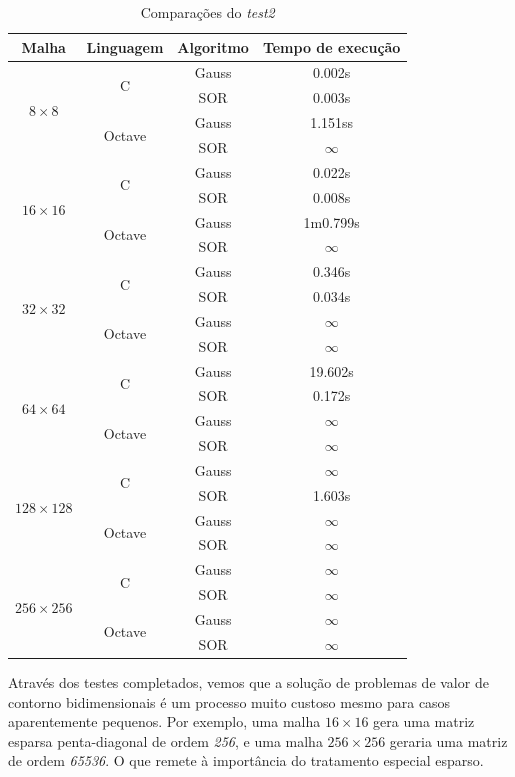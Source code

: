 \documentclass[
	11pt,				%
	oneside,			%
	a4paper,			%
	english,			%
	brazil,				%
	]{article}
\begin{document}
\begin{table}[ht]
\centering
\begin{tabular}{cccc}
\hline 
\textbf{Malha} & \textbf{Linguagem} & \textbf{Algoritmo} & \textbf{Tempo de execução} \\
\hline
\multirow{4}{*}{\textit{$8 \times 8$}} & \multirow{2}{*}{C}  & Gauss & 0.002s  \\ 
& & SOR & 0.003s  \\
& \multirow{2}{*}{Octave} & Gauss & 1.151ss  \\
& & SOR & $\infty$ \\
\hline
\multirow{4}{*}{\textit{$16 \times 16$}} & \multirow{2}{*}{C} & Gauss & 0.022s  \\ 
& & SOR & 0.008s  \\
& \multirow{2}{*}{Octave} & Gauss & 1m0.799s  \\
& & SOR & $\infty$ \\
\hline
\multirow{4}{*}{\textit{$32 \times 32$}} & \multirow{2}{*}{C} & Gauss & 0.346s  \\ 
& & SOR & 0.034s  \\
& \multirow{2}{*}{Octave} & Gauss & $\infty$  \\
& & SOR & $\infty$ \\
\hline
\multirow{4}{*}{\textit{$64 \times 64$}} & \multirow{2}{*}{C} & Gauss & 19.602s  \\ 
& & SOR & 0.172s  \\
& \multirow{2}{*}{Octave} & Gauss & $\infty$  \\
& & SOR & $\infty$ \\
\hline
\multirow{4}{*}{\textit{$128 \times 128$}} & \multirow{2}{*}{C} & Gauss & $\infty$  \\ 
& & SOR & 1.603s  \\
& \multirow{2}{*}{Octave} & Gauss & $\infty$  \\
& & SOR & $\infty$ \\
\hline
\multirow{4}{*}{\textit{$256 \times 256$}} & \multirow{2}{*}{C} & Gauss & $\infty$  \\ 
& & SOR & $\infty$  \\
& \multirow{2}{*}{Octave} & Gauss & $\infty$  \\
& & SOR & $\infty$ \\
\hline
\end{tabular}
\caption{Comparações do \textit{test2}}
\label{tab:cmp2}
\end{table}

Através dos testes completados, vemos que a solução de problemas de valor de contorno bidimensionais é um processo muito custoso mesmo para casos aparentemente pequenos. Por exemplo, uma malha $16\times16$ gera uma matriz esparsa penta-diagonal de ordem \textit{256}, e uma malha $256\times256$ geraria uma matriz de ordem \textit{65536}. O que remete à importância do tratamento especial esparso.
\end{document}

